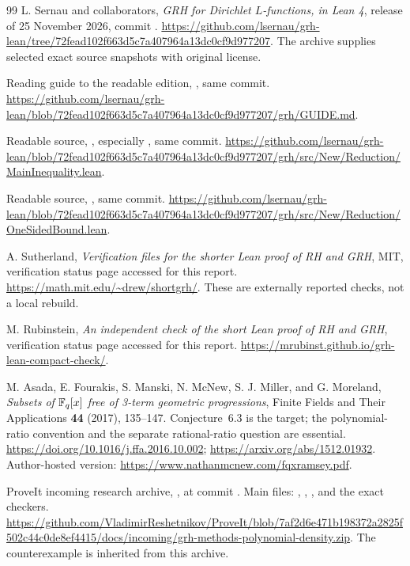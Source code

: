 \begin{thebibliography}{99}
\small
{}
L. Sernau and collaborators, \emph{GRH for Dirichlet \(L\)-functions,
in Lean 4}, release of 25 November 2026, commit
.
\url{https://github.com/lsernau/grh-lean/tree/72fead102f663d5c7a407964a13dc0cf9d977207}.
The archive supplies selected exact source snapshots with original license.

Reading guide to the readable edition,
, same commit.
\url{https://github.com/lsernau/grh-lean/blob/72fead102f663d5c7a407964a13dc0cf9d977207/grh/GUIDE.md}.

Readable source,
, especially
, same commit.
\url{https://github.com/lsernau/grh-lean/blob/72fead102f663d5c7a407964a13dc0cf9d977207/grh/src/New/Reduction/MainInequality.lean}.

Readable source,
, same commit.
\url{https://github.com/lsernau/grh-lean/blob/72fead102f663d5c7a407964a13dc0cf9d977207/grh/src/New/Reduction/OneSidedBound.lean}.

A. Sutherland, \emph{Verification files for the shorter Lean proof of RH
and GRH}, MIT, verification status page accessed for this report.
\url{https://math.mit.edu/~drew/shortgrh/}.
These are externally reported checks, not a local rebuild.

M. Rubinstein, \emph{An independent check of the short Lean proof of RH
and GRH}, verification status page accessed for this report.
\url{https://mrubinst.github.io/grh-lean-compact-check/}.

M. Asada, E. Fourakis, S. Manski, N. McNew, S. J. Miller, and G. Moreland,
\emph{Subsets of \(\mathbb F_q[x]\) free of 3-term geometric progressions},
Finite Fields and Their Applications \textbf{44} (2017), 135--147.
Conjecture~6.3 is the target; the polynomial-ratio convention and the
separate rational-ratio question are essential.
\url{https://doi.org/10.1016/j.ffa.2016.10.002};
\url{https://arxiv.org/abs/1512.01932}.
Author-hosted version:
\url{https://www.nathanmcnew.com/fqxramsey.pdf}.

ProveIt incoming research archive,
, at commit
.
Main files: ,
, , and the exact checkers.
\url{https://github.com/VladimirReshetnikov/ProveIt/blob/7af2d6e471b198372a2825f502c44c0de8ef4415/docs/incoming/grh-methods-polynomial-density.zip}.
The counterexample is inherited from this archive.


\end{thebibliography}
